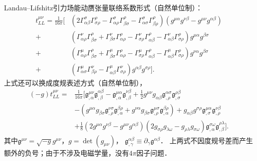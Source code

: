 Landau--Lifshitz引力场能动赝张量联络系数形式（自然单位制）：
\begin{equation}\label{chlh:eqn_t-stress-Gamma}
    \begin{aligned}
        t_{LL}^{\mu \nu}  = \frac{1}{16\pi}\Big[
        &(2\Gamma^{\sigma}_{\alpha \beta}\Gamma^{\rho}_{\sigma \rho}
        - \Gamma^{\sigma}_{\alpha \rho}\Gamma^{\rho}_{\beta \sigma}
        - \Gamma^{\sigma}_{\alpha \sigma}\Gamma^{\rho}_{\beta \rho})
        (g^{\mu \alpha}g^{\nu \beta} - g^{\mu \nu}g^{\alpha \beta})  \\
        +&(\Gamma^{\nu}_{\alpha \rho}\Gamma^{\rho}_{\beta \sigma}
        + \Gamma^{\nu}_{\beta \sigma} \Gamma^{\rho}_{\alpha \rho}
        - \Gamma^{\nu}_{\sigma \rho} \Gamma^{\rho}_{\alpha \beta}
        - \Gamma^{\nu}_{\alpha \beta} \Gamma^{\rho}_{\sigma \rho})g^{\mu \alpha}g^{\beta \sigma}  \\
        +&(\Gamma^{\mu}_{\alpha \rho}\Gamma^{\rho}_{\beta \sigma}
        +\Gamma^{\mu}_{\beta \sigma} \Gamma^{\rho}_{\alpha \rho}
        - \Gamma^{\mu}_{\sigma \rho} \Gamma^{\rho}_{\alpha \beta}
        - \Gamma^{\mu}_{\alpha \beta} \Gamma^{\rho}_{\sigma \rho})g^{\nu \alpha}g^{\beta \sigma}  \\
        +&(\Gamma^{\mu}_{\alpha \sigma} \Gamma^{\nu}_{\beta \rho}
        - \Gamma^{\mu}_{\alpha \beta} \Gamma^{\nu}_{\sigma \rho})g^{\alpha \beta}g^{\sigma \rho}\Big].
    \end{aligned}
\end{equation}
上式还可以换成度规表述方式（自然单位制），
\begin{equation}\label{chlh:eqn_t-stress-metric}
    \begin{aligned}
        (-g)t_{LL}^{\mu \nu} =& \frac{1}{16\pi} \Big[\mathfrak{g}^{\mu \nu}_{,\alpha}
        \mathfrak{g}^{\alpha \beta}_{,\beta} - \mathfrak{g}^{\mu \alpha}_{,\alpha}\mathfrak{g}^{\nu \beta}_{,\beta} +
        \frac{1}{2}g^{\mu \nu}g_{\alpha \beta}\mathfrak{g}^{\alpha \sigma}_{,\rho} \mathfrak{g}^{\rho \beta}_{,\sigma} \\
        &-(g^{\mu \alpha}g_{\beta \sigma}\mathfrak{g}^{\nu \sigma}_{,\rho}
        \mathfrak{g}^{\beta \rho}_{,\alpha}+g^{\nu \alpha}g_{\beta \sigma}
        \mathfrak{g}^{\mu \sigma}_{,\rho}\mathfrak{g}^{\beta \rho}_{,\alpha}) + g_{\alpha \beta}g^{\sigma \rho}
        \mathfrak{g}^{\mu \alpha}_{,\sigma}\mathfrak{g}^{\nu \beta}_{,\rho} \\
        &+\frac{1}{8}(2g^{\mu \alpha}g^{\nu \beta}-g^{\mu \nu}g^{\alpha \beta})
        (2g_{\sigma \rho}g_{\lambda \omega}-g_{\rho \lambda}g_{\sigma \omega})
        \mathfrak{g}^{\sigma \omega}_{,\alpha}\mathfrak{g}^{\rho \lambda}_{,\beta}   \Big] .
    \end{aligned}
\end{equation}
其中$\mathfrak{g}^{\mu\nu}=\sqrt{-g}g^{\mu\nu}$，$g=\det(g_{\mu\nu})$，
$\mathfrak{g}^{\alpha \beta}_{,\gamma}\equiv \partial_\gamma \mathfrak{g}^{\alpha \beta}$．
上两式不因度规号差而产生额外的负号；由于不涉及电磁学量，没有$4\pi$因子问题．







\printbibliography[heading=subbibliography,title=第\ref{chlh}章参考文献]

\endinput



